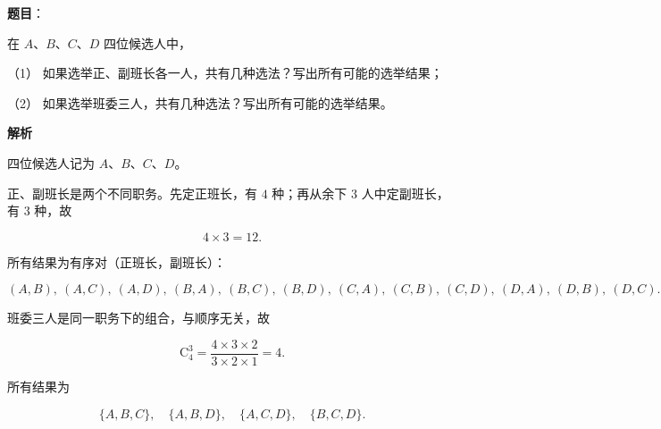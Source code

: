 \begin{answer}

\textbf{题目}：

在 $A$、$B$、$C$、$D$ 四位候选人中，

（1） 如果选举正、副班长各一人，共有几种选法？写出所有可能的选举结果；

（2） 如果选举班委三人，共有几种选法？写出所有可能的选举结果。

\textbf{解析}

四位候选人记为 $A$、$B$、$C$、$D$。


正、副班长是两个不同职务。先定正班长，有 $4$ 种；再从余下 $3$ 人中定副班长，有 $3$ 种，故

\nopagebreak[4]
\[
4\times 3=12.
\]

所有结果为有序对（正班长，副班长）：

\nopagebreak[4]
\[
(A,B),\ (A,C),\ (A,D),\ (B,A),\ (B,C),\ (B,D),\ (C,A),\ (C,B),\ (C,D),\ (D,A),\ (D,B),\ (D,C).
\]


班委三人是同一职务下的组合，与顺序无关，故

\nopagebreak[4]
\[
\mathrm{C}_4^3=\frac{4\times3\times2}{3\times2\times1}=4.
\]

所有结果为

\nopagebreak[4]
\[
\{A,B,C\},\quad \{A,B,D\},\quad \{A,C,D\},\quad \{B,C,D\}.
\]



\end{answer}
